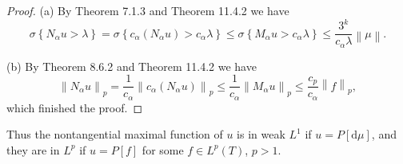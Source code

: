 \begin{proof}
(a) By Theorem 7.1.3 and Theorem 11.4.2 we have 
$$
\sigma \left\{ N_{\alpha}u>\lambda \right\} =\sigma \left\{ c_{\alpha}\left( N_{\alpha}u \right) >c_{\alpha}\lambda \right\} \le \sigma \left\{ M_{\alpha}u>c_{\alpha}\lambda \right\} \le \frac{3^k}{c_{\alpha}\lambda}\left\| \mu \right\| .
$$\par
(b) By Theorem 8.6.2 and Theorem 11.4.2 we have 
$$
\left\| N_{\alpha}u \right\| _p=\frac{1}{c_{\alpha}}\left\| c_{\alpha}\left( N_{\alpha}u \right) \right\| _p\le \frac{1}{c_{\alpha}}\left\| M_{\alpha}u \right\| _p\le \frac{c_p}{c_{\alpha}}\left\| f \right\| _p,
$$
which finished the proof.
\end{proof}
Thus the nontangential maximal function of $u$ is in weak $L^1$ if $u=P[\mathrm{d}\mu]$, and they are in $L^p$ if $u=P[f]$ for some $f\in L^p(T)$, $p>1$.
